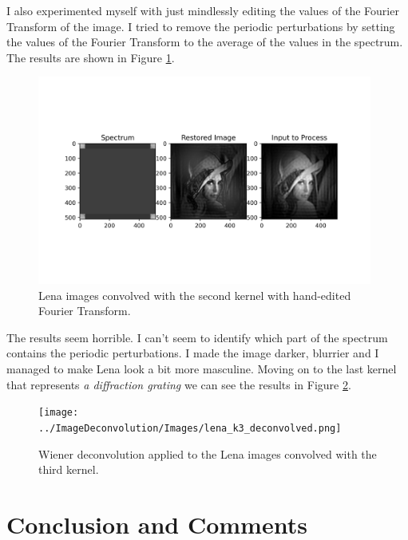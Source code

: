 \documentclass[10pt, titlepage, a4paper]{article}
\begin{document}
I also experimented myself with just mindlessly editing the values of the Fourier Transform of the image. I tried to
remove the periodic perturbations by setting the values of the Fourier Transform to the average of the values in the
spectrum. The results are shown in Figure \ref{fig:lena-2-averaging}.

\begin{figure}[H]
    \centering
    \includegraphics[width=0.98\textwidth]{../ImageDeconvolution/Images/lena_k2_deconvolved_spectra.png}
    \caption{Lena images convolved with the second kernel with hand-edited Fourier Transform.}
    \label{fig:lena-2-averaging}
\end{figure}

The results seem horrible. I can't seem to identify which part of the spectrum contains the periodic perturbations.
I made the image darker, blurrier and I managed to make Lena look a bit more masculine. Moving on to the last 
kernel that represents \textit{a diffraction grating} we can see the results in Figure \ref{fig:lena-3}.

\begin{figure}[H]
    \centering
    \texttt{[image: ../ImageDeconvolution/Images/lena\_k3\_deconvolved.png]}
    \caption{Wiener deconvolution applied to the Lena images convolved with the third kernel.}
    \label{fig:lena-3}
\end{figure}

\section{Conclusion and Comments}

% 
% 
\end{document}
